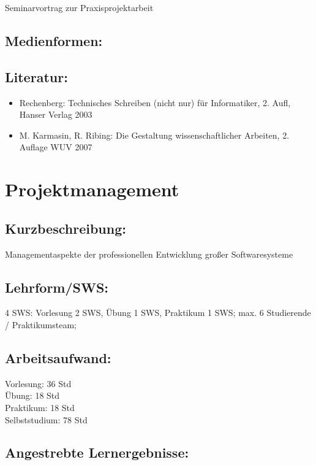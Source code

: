 Seminarvortrag zur Praxisprojektarbeit

\section{Medienformen:}\label{medienformen-19}

\section{Literatur:}\label{literatur-19}

\begin{itemize}
\item
  Rechenberg: Technisches Schreiben (nicht nur) für Informatiker, 2.
  Aufl, Hanser Verlag 2003
\item
  M. Karmasin, R. Ribing: Die Gestaltung wissenschaftlicher Arbeiten, 2.
  Auflage WUV 2007
\end{itemize}

\chapter{Projektmanagement}\label{projektmanagement}

\section{Kurzbeschreibung:}\label{kurzbeschreibung-3}

Managementaspekte der professionellen Entwicklung großer Softwaresysteme

\section{Lehrform/SWS:}\label{lehrformsws-19}

4 SWS: Vorlesung 2 SWS, Übung 1 SWS, Praktikum 1 SWS; max. 6 Studierende
/ Praktikumsteam;

\section{Arbeitsaufwand:}\label{arbeitsaufwand-19}

Vorlesung: 36 Std\\
Übung: 18 Std\\
Praktikum: 18 Std\\
Selbststudium: 78 Std

\section{Angestrebte
Lernergebnisse:}\label{angestrebte-lernergebnisse-20}

